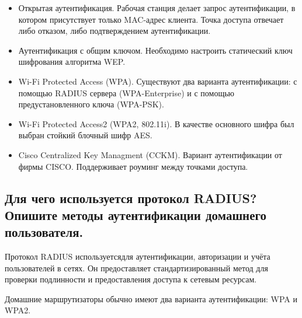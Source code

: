 \begin{itemize}
	\item Открытая аутентификация. Рабочая станция делает запрос 
		аутентификации, в котором присутствует только MAC-адрес 
		клиента. Точка доступа отвечает либо отказом, либо 
		подтверждением аутентификации.
	\item Аутентификация с общим ключом. Необходимо настроить 
		статический ключ шифрования алгоритма WEP.
	\item Wi-Fi Protected Access (WPA). Существуют два варианта 
		аутентификации: с помощью RADIUS сервера (WPA-Enterprise) и с 
		помощью предустановленного ключа (WPA-PSK).
	\item Wi-Fi Protected Access2 (WPA2, 802.11i). В качестве основного 
		шифра был выбран стойкий блочный шифр AES.
	\item Cisco Centralized Key Managment (CCKM). Вариант 
		аутентификации от фирмы CISCO. Поддерживает роуминг между 
		точками доступа.
\end{itemize}

\subsection{Для чего используется протокол RADIUS? Опишите методы 
аутентификации домашнего пользователя.}

Протокол RADIUS используетсядля аутентификации, авторизации и 
учёта пользователей в сетях. Он предоставляет стандартизированный метод 
для проверки подлинности и предоставления доступа к сетевым ресурсам.\par
Домашние маршрутизаторы обычно имеют два варианта 
аутентификации: WPA и WPA2.

